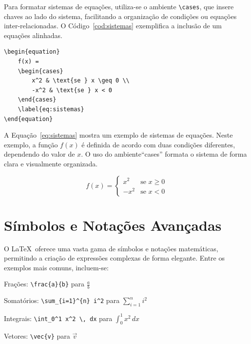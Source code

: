Para formatar sistemas de equações, utiliza-se o ambiente \texttt{\textbackslash cases}, que insere chaves ao lado do sistema, facilitando a organização de condições ou equações inter-relacionadas. O Código~\ref{cod:sistemas} exemplifica a inclusão de um equações alinhadas.

\begin{codigo}[htb]
\begin{lstlisting}
\begin{equation}
    f(x) =
    \begin{cases}
        x^2 & \text{se } x \geq 0 \\
        -x^2 & \text{se } x < 0
    \end{cases}
    \label{eq:sistemas}
\end{equation}
\end{lstlisting}
\fonteautor
\end{codigo}

A Equação~\eqref{eq:sistemas} mostra um exemplo de sistemas de equações. Neste exemplo, a função \( f(x) \) é definida de acordo com duas condições diferentes, dependendo do valor de \( x \). O uso do ambiente``cases'' formata o sistema de forma clara e visualmente organizada.

\begin{equation}
    f(x) =
    \begin{cases}
        x^2 & \text{se } x \geq 0 \\
        -x^2 & \text{se } x < 0
    \end{cases}
    \label{eq:sistemas}
\end{equation}

\section{Símbolos e Notações Avançadas}

O \LaTeX\ oferece uma vasta gama de símbolos e notações matemáticas, permitindo a criação de expressões complexas de forma elegante. Entre os exemplos mais comuns, incluem-se:

\begin{alineas}
    \item Frações: \verb|\frac{a}{b}| para \( \frac{a}{b} \)
    \item Somatórios: \verb|\sum_{i=1}^{n} i^2| para \( \sum_{i=1}^{n} i^2 \)
    \item Integrais: \verb|\int_0^1 x^2 \, dx| para \( \int_0^1 x^2 \, dx \)
    \item Vetores: \verb|\vec{v}| para \( \vec{v} \)
\end{alineas}

